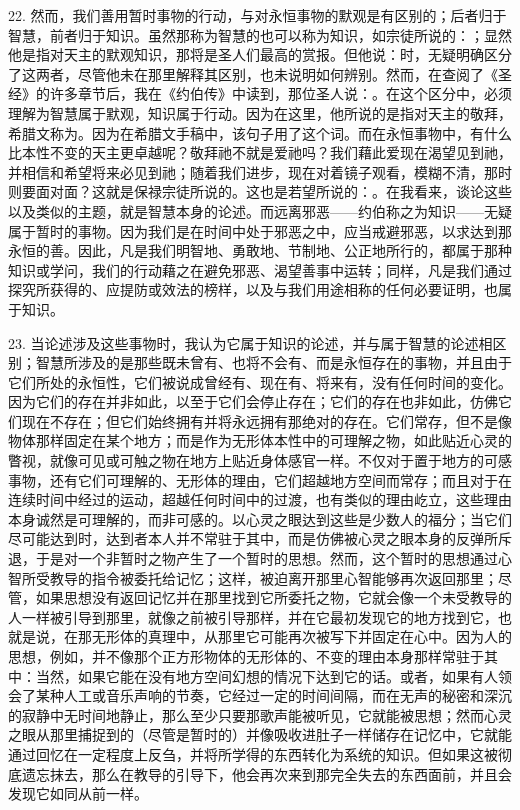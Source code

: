 22. 然而，我们善用暂时事物的行动，与对永恒事物的默观是有区别的；后者归于智慧，前者归于知识。虽然那称为智慧的也可以称为知识，如宗徒所说的：；显然他是指对天主的默观知识，那将是圣人们最高的赏报。但他说：时，无疑明确区分了这两者，尽管他未在那里解释其区别，也未说明如何辨别。然而，在查阅了《圣经》的许多章节后，我在《约伯传》中读到，那位圣人说：。在这个区分中，必须理解为智慧属于默观，知识属于行动。因为在这里，他所说的是指对天主的敬拜，希腊文称为。因为在希腊文手稿中，该句子用了这个词。而在永恒事物中，有什么比本性不变的天主更卓越呢？敬拜祂不就是爱祂吗？我们藉此爱现在渴望见到祂，并相信和希望将来必见到祂；随着我们进步，现在对着镜子观看，模糊不清，那时则要面对面？这就是保禄宗徒所说的。这也是若望所说的：。在我看来，谈论这些以及类似的主题，就是智慧本身的论述。而远离邪恶——约伯称之为知识——无疑属于暂时的事物。因为我们是在时间中处于邪恶之中，应当戒避邪恶，以求达到那永恒的善。因此，凡是我们明智地、勇敢地、节制地、公正地所行的，都属于那种知识或学问，我们的行动藉之在避免邪恶、渴望善事中运转；同样，凡是我们通过探究所获得的、应提防或效法的榜样，以及与我们用途相称的任何必要证明，也属于知识。\par

23. 当论述涉及这些事物时，我认为它属于知识的论述，并与属于智慧的论述相区别；智慧所涉及的是那些既未曾有、也将不会有、而是永恒存在的事物，并且由于它们所处的永恒性，它们被说成曾经有、现在有、将来有，没有任何时间的变化。因为它们的存在并非如此，以至于它们会停止存在；它们的存在也非如此，仿佛它们现在不存在；但它们始终拥有并将永远拥有那绝对的存在。它们常存，但不是像物体那样固定在某个地方；而是作为无形体本性中的可理解之物，如此贴近心灵的瞥视，就像可见或可触之物在地方上贴近身体感官一样。不仅对于置于地方的可感事物，还有它们可理解的、无形体的理由，它们超越地方空间而常存；而且对于在连续时间中经过的运动，超越任何时间中的过渡，也有类似的理由屹立，这些理由本身诚然是可理解的，而非可感的。以心灵之眼达到这些是少数人的福分；当它们尽可能达到时，达到者本人并不常驻于其中，而是仿佛被心灵之眼本身的反弹所斥退，于是对一个非暂时之物产生了一个暂时的思想。然而，这个暂时的思想通过心智所受教导的指令被委托给记忆；这样，被迫离开那里心智能够再次返回那里；尽管，如果思想没有返回记忆并在那里找到它所委托之物，它就会像一个未受教导的人一样被引导到那里，就像之前被引导那样，并在它最初发现它的地方找到它，也就是说，在那无形体的真理中，从那里它可能再次被写下并固定在心中。因为人的思想，例如，并不像那个正方形物体的无形体的、不变的理由本身那样常驻于其中：当然，如果它能在没有地方空间幻想的情况下达到它的话。或者，如果有人领会了某种人工或音乐声响的节奏，它经过一定的时间间隔，而在无声的秘密和深沉的寂静中无时间地静止，那么至少只要那歌声能被听见，它就能被思想；然而心灵之眼从那里捕捉到的（尽管是暂时的）并像吸收进肚子一样储存在记忆中，它就能通过回忆在一定程度上反刍，并将所学得的东西转化为系统的知识。但如果这被彻底遗忘抹去，那么在教导的引导下，他会再次来到那完全失去的东西面前，并且会发现它如同从前一样。\par


